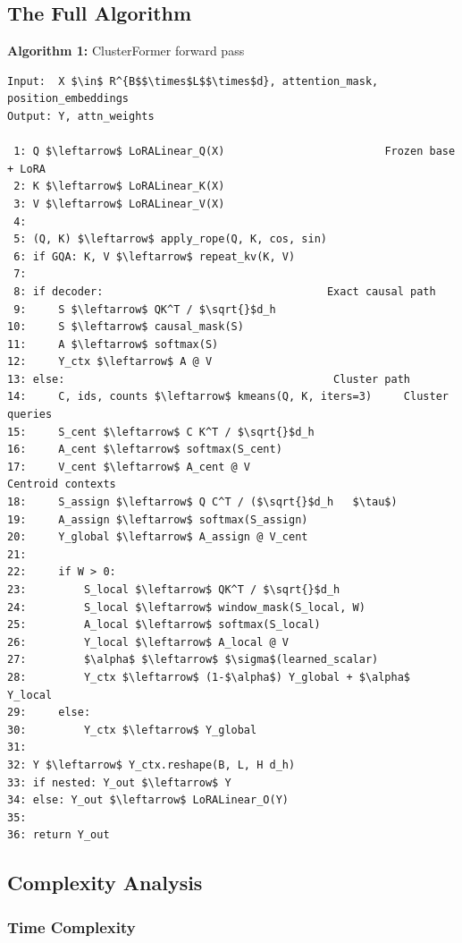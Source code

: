 \subsection{The Full Algorithm}

\textbf{Algorithm 1:} ClusterFormer forward pass
\begin{lstlisting}
Input:  X $\in$ R^{B$$\times$L$$\times$d}, attention_mask, position_embeddings
Output: Y, attn_weights

 1: Q $\leftarrow$ LoRALinear_Q(X)                         Frozen base + LoRA
 2: K $\leftarrow$ LoRALinear_K(X)
 3: V $\leftarrow$ LoRALinear_V(X)
 4:
 5: (Q, K) $\leftarrow$ apply_rope(Q, K, cos, sin)
 6: if GQA: K, V $\leftarrow$ repeat_kv(K, V)
 7:
 8: if decoder:                                   Exact causal path
 9:     S $\leftarrow$ QK^T / $\sqrt{}$d_h
10:     S $\leftarrow$ causal_mask(S)
11:     A $\leftarrow$ softmax(S)
12:     Y_ctx $\leftarrow$ A @ V
13: else:                                          Cluster path
14:     C, ids, counts $\leftarrow$ kmeans(Q, K, iters=3)     Cluster queries
15:     S_cent $\leftarrow$ C K^T / $\sqrt{}$d_h
16:     A_cent $\leftarrow$ softmax(S_cent)
17:     V_cent $\leftarrow$ A_cent @ V                         Centroid contexts
18:     S_assign $\leftarrow$ Q C^T / ($\sqrt{}$d_h   $\tau$)
19:     A_assign $\leftarrow$ softmax(S_assign)
20:     Y_global $\leftarrow$ A_assign @ V_cent
21:
22:     if W > 0:
23:         S_local $\leftarrow$ QK^T / $\sqrt{}$d_h
24:         S_local $\leftarrow$ window_mask(S_local, W)
25:         A_local $\leftarrow$ softmax(S_local)
26:         Y_local $\leftarrow$ A_local @ V
27:         $\alpha$ $\leftarrow$ $\sigma$(learned_scalar)
28:         Y_ctx $\leftarrow$ (1-$\alpha$) Y_global + $\alpha$ Y_local
29:     else:
30:         Y_ctx $\leftarrow$ Y_global
31:
32: Y $\leftarrow$ Y_ctx.reshape(B, L, H d_h)
33: if nested: Y_out $\leftarrow$ Y
34: else: Y_out $\leftarrow$ LoRALinear_O(Y)
35:
36: return Y_out
\end{lstlisting}

\subsection{Complexity Analysis}

\subsubsection{Time Complexity}

